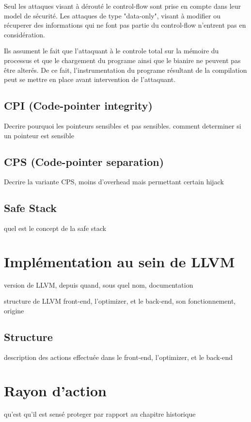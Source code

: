 Seul les attaques visant à dérouté le control-flow sont prise en compte dans leur model de sécurité. Les attaques de type "data-only", visant à modifier ou récuperer des informations qui ne font pas partie du control-flow n'entrent pas en considération.

Ils assument le fait que l'attaquant à le controle total sur la mémoire du processus et que le chargement du programe ainsi que le bianire ne peuvent pas être alterés. De ce fait, l'instrumentation du programe résultant de la compilation peut se mettre en place avant intervention de l'attaquant.

\subsection{CPI (Code-pointer integrity)}

Decrire pourquoi les pointeurs sensibles et pas sensibles. comment determiner si un pointeur est sensible

\subsection{CPS (Code-pointer separation)}

Decrire la variante CPS, moins d'overhead mais permettant certain hijack

\subsection{Safe Stack}

quel est le concept de la safe stack

\section{Implémentation au sein de LLVM}

version de LLVM, depuis quand, sous quel nom, documentation

structure de LLVM front-end, l'optimizer, et le back-end, son fonctionnement, origine

\subsection{Structure}

description des actions effectuée dans le front-end, l'optimizer, et le back-end

\section{Rayon d'action}

qu'est qu'il est sensé proteger par rapport au chapitre historique
